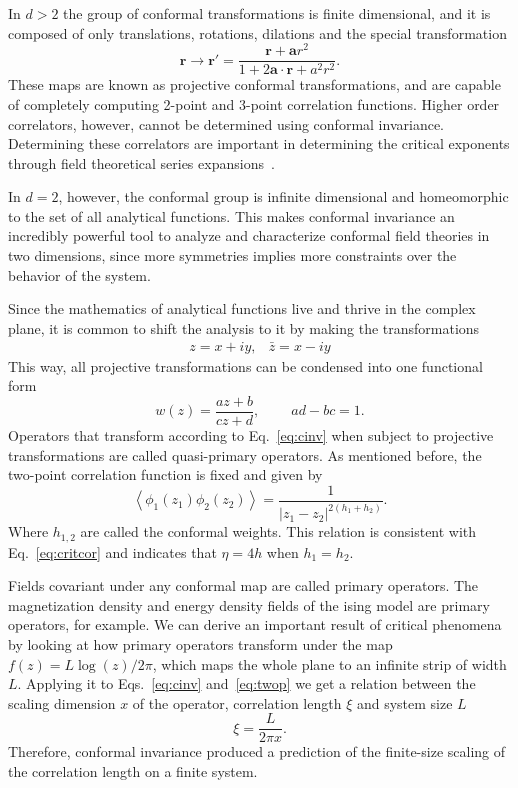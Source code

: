 In $d>2$ the group of conformal transformations is finite dimensional, and
it is composed of only translations, rotations, dilations and the special
transformation
\begin{equation}
    \mathbf{r}\rightarrow\mathbf{r}'=
    \frac{\mathbf{r}+\mathbf{a}r^{2}}{1+2\mathbf{a}\cdot\mathbf{r}+a^{2}r^{2}}.
\end{equation}
These maps are known as projective conformal transformations, and are capable
of completely computing 2-point and 3-point correlation functions. Higher
order correlators, however, cannot be determined using conformal invariance.
Determining these correlators are important in determining the critical
exponents through field theoretical series expansions~\cite{Henkel2013}.

In $d=2$, however, the conformal group is infinite dimensional and homeomorphic
to the set of all analytical functions. This makes conformal invariance an
incredibly powerful tool to analyze and characterize conformal field theories
in two dimensions, since more symmetries implies more constraints over the
behavior of the system.

Since the mathematics of analytical functions live and thrive in the complex
plane, it is common to shift the analysis to it by making the transformations
\begin{equation}
    \begin{array}{cc}
        z=x+iy, & \bar{z}=x-iy
    \end{array}
\end{equation}
This way, all projective transformations can be condensed into one functional
form
\begin{equation}
    w\left(z\right)=\frac{az+b}{cz+d},\;\;\;\;\;\;\;\; ad-bc=1.
\end{equation}
Operators that transform according to Eq.~\ref{eq:cinv} when subject to
projective transformations are called quasi-primary operators.
As mentioned before, the two-point correlation function is fixed and given by
\begin{equation}
    \label{eq:twop}
    \left\langle
        \phi_{1}\left(z_{1}\right)\phi_{2}\left(z_{2}\right)
    \right\rangle =
    \frac{1}{\left|z_{1}-z_{2}\right|^{2(h_{1}+h_{2})}}.
\end{equation}
Where $h_{1,2}$ are called the conformal weights. This relation is consistent
with Eq.~\ref{eq:critcor} and indicates that $\eta=4h$ when $h_1=h_2$.

Fields covariant under any conformal map are called primary operators. The
magnetization density and energy density fields of the ising model are primary
operators, for example. We can derive an important result of critical phenomena
by looking at how primary operators transform under the map
$f(z)=L\log(z)/2\pi$, which maps the whole plane to an infinite strip of width
$L$. Applying it to Eqs.~\ref{eq:cinv} and~\ref{eq:twop} we get a relation
between the scaling dimension $x$ of the operator, correlation length $\xi$ and
system size $L$
\begin{equation}
    \xi=\frac{L}{2\pi x}.
\end{equation}
Therefore, conformal invariance produced a prediction of the finite-size
scaling of the correlation length on a finite system.

